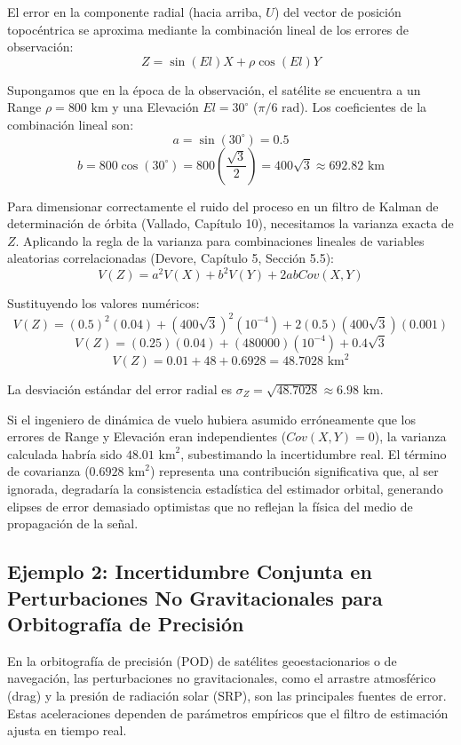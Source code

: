El error en la componente radial (hacia arriba, $U$) del vector de posición topocéntrica se aproxima mediante la combinación lineal de los errores de observación:
$$ Z = \sin(El) X + \rho \cos(El) Y $$

Supongamos que en la época de la observación, el satélite se encuentra a un Range $\rho = 800 \text{ km}$ y una Elevación $El = 30^\circ$ ($\pi/6 \text{ rad}$). Los coeficientes de la combinación lineal son:
$$ a = \sin(30^\circ) = 0.5 $$
$$ b = 800 \cos(30^\circ) = 800 \left(\frac{\sqrt{3}}{2}\right) = 400\sqrt{3} \approx 692.82 \text{ km} $$

Para dimensionar correctamente el ruido del proceso en un filtro de Kalman de determinación de órbita (Vallado, Capítulo 10), necesitamos la varianza exacta de $Z$. Aplicando la regla de la varianza para combinaciones lineales de variables aleatorias correlacionadas (Devore, Capítulo 5, Sección 5.5):
$$ V(Z) = a^2 V(X) + b^2 V(Y) + 2ab Cov(X,Y) $$

Sustituyendo los valores numéricos:
$$ V(Z) = (0.5)^2 (0.04) + (400\sqrt{3})^2 (10^{-4}) + 2(0.5)(400\sqrt{3})(0.001) $$
$$ V(Z) = (0.25)(0.04) + (480000)(10^{-4}) + 0.4\sqrt{3} $$
$$ V(Z) = 0.01 + 48 + 0.6928 = 48.7028 \text{ km}^2 $$

La desviación estándar del error radial es $\sigma_Z = \sqrt{48.7028} \approx 6.98 \text{ km}$. 

Si el ingeniero de dinámica de vuelo hubiera asumido erróneamente que los errores de Range y Elevación eran independientes ($Cov(X,Y) = 0$), la varianza calculada habría sido $48.01 \text{ km}^2$, subestimando la incertidumbre real. El término de covarianza ($0.6928 \text{ km}^2$) representa una contribución significativa que, al ser ignorada, degradaría la consistencia estadística del estimador orbital, generando elipses de error demasiado optimistas que no reflejan la física del medio de propagación de la señal.

\subsection{Ejemplo 2: Incertidumbre Conjunta en Perturbaciones No Gravitacionales para Orbitografía de Precisión}

En la orbitografía de precisión (POD) de satélites geoestacionarios o de navegación, las perturbaciones no gravitacionales, como el arrastre atmosférico (drag) y la presión de radiación solar (SRP), son las principales fuentes de error. Estas aceleraciones dependen de parámetros empíricos que el filtro de estimación ajusta en tiempo real. 

